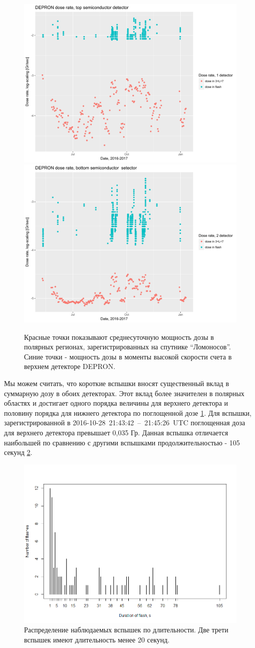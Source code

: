 \begin{figure}
	\centering
	\includegraphics[width=0.49\linewidth, trim={0 0.7cm 0 0}, clip]{images/doseanalisys/flashdose1}
	\includegraphics[width=0.49\linewidth, trim={0 0.7cm 0 0}, clip]{images/doseanalisys/flashdose2}
	\caption{Красные точки показывают среднесуточную мощность дозы в полярных регионах, зарегистрированных на спутнике ``Ломоносов''. Синие точки - мощность дозы в моменты высокой скорости счета в верхнем детекторе DEPRON.}
	\label{fig:flashdose1}
\end{figure}
Мы можем считать, что короткие вспышки вносят существенный вклад в суммарную дозу в обоих детекторах. Этот вклад более значителен в полярных областях и достигает одного порядка величины для верхнего детектора и половину порядка для нижнего детектора по поглощенной дозе \ref{fig:flashdose1}.  Для вспышки, зарегистрированной в 2016-10-28~21:43:42~--~21:45:26~UTC поглощенная доза для верхнего детектора превышает 0,035 Гр. Данная вспышка отличается наибольшей по сравнению с другими вспышками продолжительностью - 105 секунд \ref{fig:rplot12}.

\begin{figure}
	\centering
	\includegraphics[width=0.7\linewidth]{images/Flash/Rplot12}
	\caption{Распределение наблюдаемых вспышек по длительности. Две трети вспышек имеют длительность менее 20 секунд.}
	\label{fig:rplot12}
\end{figure}




